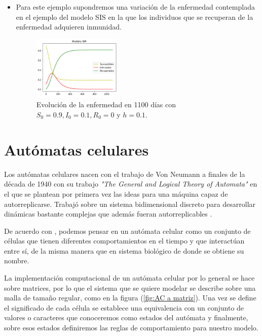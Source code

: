 \begin{itemize}
    \item Para este ejemplo supondremos una variación de la enfermedad contemplada en el ejemplo del modelo SIS en la que los individuos que se recuperan de la enfermedad adquieren inmunidad.
    
    \begin{figure}[h]
      \centering
        \includegraphics[width=0.4\textwidth]{Imagenes/ex1SIR.PNG}
      \caption{\centering Evolución de la enfermedad en 1100 días con $S_0=0.9,I_0=0.1,R_0=0$ y $h=0.1$.}
      \label{fig:Ejemplo 1 - SIR}
    \end{figure}
\end{itemize}

\section{Autómatas celulares}\label{sec:Autómatas celulares}

Los autómatas celulares nacen con el trabajo de Von Neumann a finales de la década de 1940 con su trabajo \textit{"The
General and Logical Theory of Automata"} en el que se plantean por primera vez las ideas para una máquina capaz de autorreplicarse. Trabajó sobre un sistema bidimensional discreto para desarrollar dinámicas bastante complejas que además fueran autorreplicables \cite{alfons2010,ACaplicacionesComputacion}.

De acuerdo con \cite{descripcionyAplicaciones}, podemos pensar en un autómata celular como un conjunto de células que tienen diferentes comportamientos en el tiempo y que interactúan entre sí, de la misma manera que en sistema biológico de donde se obtiene su nombre.

La implementación computacional de un autómata celular por lo general se hace sobre matrices, por lo que el sistema que se quiere modelar se describe sobre una malla de tamaño regular, como en la figura (\ref{fig:AC a matriz}). Una vez se define el significado de cada célula se establece una equivalencia con un conjunto de valores o caracteres que conoceremos como estados del autómata y finalmente, sobre esos estados definiremos las reglas de comportamiento para nuestro modelo.

